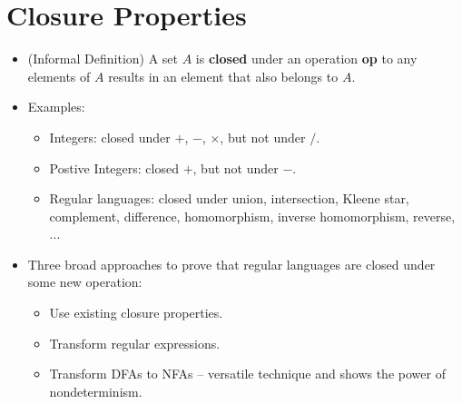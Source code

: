 \documentclass[12pt]{article}
\date{February 11, 2021}
\begin{document}
\maketitle

\section{Closure Properties}
\begin{itemize}
    \item (Informal Definition) A set $A$ is \textbf{closed} under an operation \textbf{op} to any elements of $A$ results in an element that also belongs to $A$.
    \item Examples:
    \begin{itemize}
        \item Integers: closed under $+$, $-$, $\times$, but not under $/$.
        \item Postive Integers: closed $+$, but not under $-$.
        \item Regular languages: closed under union, intersection, Kleene star, complement, difference, homomorphism, inverse homomorphism, reverse, ...
    \end{itemize}
    \item Three broad approaches to prove that regular languages are closed under some new operation:
    \begin{itemize}
        \item Use existing closure properties.
        \item Transform regular expressions.
        \item Transform DFAs to NFAs -- versatile technique and shows the power of nondeterminism.
    \end{itemize}
\end{itemize}
\end{document}
